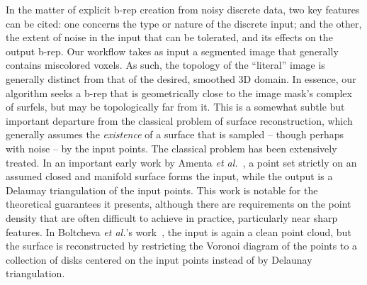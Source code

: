 In the matter of explicit b-rep creation from noisy discrete data, two key features can be cited:  one concerns the type or nature of the discrete input; and the other, the extent of noise in the input that can be tolerated, and its effects on the output b-rep.  Our workflow takes as input a segmented image that generally contains miscolored voxels.  As such, the topology of the ``literal'' image is generally distinct from that of the desired, smoothed 3D domain.  In essence, our algorithm seeks a b-rep that is geometrically close to the image mask's complex of surfels, but may be topologically far from it.  This is a somewhat subtle but important departure from the classical problem of surface reconstruction, which generally assumes the {\em existence} of a surface that is sampled -- though perhaps with noise -- by the input points.  The classical problem has been extensively treated.  In an important early work by Amenta \textit{et al.}~\cite{amenta2000}, a point set strictly on an assumed closed and manifold surface forms the input, while the output is a Delaunay triangulation of the input points.  This work is notable for the theoretical guarantees it presents, although there are requirements on the point density that are often difficult to achieve in practice, particularly near sharp features.  In Boltcheva \textit{et al.}'s work~\cite{boltcheva2017}, the input is again a clean point cloud, but the surface is reconstructed by restricting the Voronoi diagram of the points to a collection of disks centered on the input points instead of by Delaunay triangulation.

